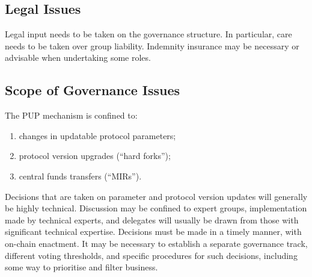 \subsection{Legal Issues}

Legal input needs to be taken on the governance structure.  In particular, care needs to be taken over group liability.  Indemnity insurance may be necessary or advisable when
undertaking some roles.



\subsection{Scope of Governance Issues}

The PUP mechanism is confined to:

\begin{enumerate}
\item
  changes in updatable protocol parameters;
\item
  protocol version upgrades (``hard forks'');
\item
  central funds transfers (``MIRs'').
\end{enumerate}

Decisions that are taken on parameter and protocol version updates will generally be highly technical.  Discussion may be confined to expert groups, implementation made by
technical experts, and delegates will usually be drawn from those with significant technical expertise.  Decisions must be made in a timely manner, with on-chain enactment.
It may be necessary to establish a separate governance track, different voting thresholds, and specific procedures for such decisions, including some way to prioritise and
filter business.
